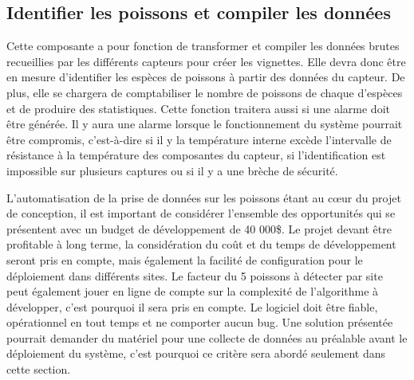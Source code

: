 \begin{table}[!htb]
\footnotesize
\centering
{}
\caption{Faisabilité des concepts pour l'acheminer des données brutes}
\label{t:Decision_acheminer}
\end{table}
 

\subsection{Identifier les poissons et compiler les données}

Cette composante a pour fonction de transformer et compiler les données brutes recueillies par les différents capteurs pour créer les vignettes. Elle devra donc être en mesure d'identifier les espèces de poissons à partir des données du capteur. De plus, elle se chargera de comptabiliser le nombre de poissons de chaque d'espèces et de produire des statistiques. Cette fonction traitera aussi si une alarme doit être générée. Il y aura une alarme lorsque le fonctionnement du système pourrait être compromis, c'est-à-dire si il y la température interne excède l'intervalle de résistance à la température des composantes du capteur, si l'identification est impossible sur plusieurs captures ou si il y a une brèche de sécurité.

L’automatisation de la prise de données sur les poissons étant au cœur du projet de conception, il est important de considérer l’ensemble des opportunités qui se présentent avec un budget de développement de 40 000\$. Le projet devant être profitable à long terme, la considération du coût et du temps de développement seront pris en compte, mais également la facilité de configuration pour le déploiement dans différents sites. Le facteur du 5 poissons à détecter par site peut également jouer en ligne de compte sur la complexité de l’algorithme à développer, c’est pourquoi il sera pris en compte. Le logiciel doit être fiable, opérationnel en tout temps et ne comporter aucun bug. Une solution présentée pourrait demander du matériel pour une collecte de données au préalable avant le déploiement du système, c’est pourquoi ce critère sera abordé seulement dans cette section. 



